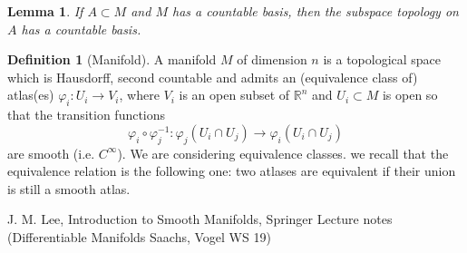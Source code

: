 \documentclass[a4paper,11pt,titlepage]{article}
\numberwithin{equation}{section}
\newtheorem{lemma}[theorem]{Lemma}
\theoremstyle{definition}
\newtheorem{definition}[theorem]{Definition}
\theoremstyle{remark}
\newcommand{\rfield}{\mathbb{R}}
\begin{document}
\begin{lemma}
If $A \subset M$ and $M$ has a countable basis, then the subspace topology on $A$ has a countable basis.
\end{lemma}

\begin{definition}[Manifold]
A manifold $M$ of dimension $n$ is a topological space which is Hausdorff, second countable and admits an (equivalence class of) atlas(es) $\varphi_i \colon U_i \rightarrow V_i$, where $V_i$ is an open subset of $\rfield^n$ and $U_i \subset M$ is open so that the transition functions
$$\varphi_i \circ \varphi_j^{-1} \colon \varphi_j(U_i \cap U_j) \rightarrow \varphi_i (U_i \cap U_j)$$ are smooth (i.e. $C^{\infty}$). We are considering equivalence classes. we recall that the equivalence relation is the following one: two atlases are equivalent if their union is still a smooth atlas.
\end{definition}


\clearpage
\begin{thebibliography}{AA}
{J.} M. Lee, Introduction to Smooth Manifolds, Springer
Lecture notes (Differentiable Manifolds Saachs, Vogel WS 19)
\end{thebibliography}
\end{document}
